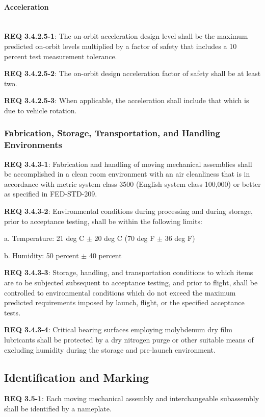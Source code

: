 \documentclass[12pt]{article}
\begin{document}
\paragraph{Acceleration} \mbox{} \\ %
\noindent \textbf{REQ 3.4.2.5-1}: The on-orbit acceleration design level shall be the maximum predicted on-orbit levels multiplied by a factor of safety that includes a 10 percent test measurement tolerance. 

\noindent \textbf{REQ 3.4.2.5-2}: The on-orbit design acceleration factor of safety shall be at least two. 

\noindent \textbf{REQ 3.4.2.5-3}: When applicable, the acceleration shall include that which is due to vehicle rotation.


\subsubsection{Fabrication, Storage, Transportation, and Handling Environments} %
\noindent \textbf{REQ 3.4.3-1}: Fabrication and handling of moving mechanical assemblies shall be accomplished in a clean room environment with an air cleanliness that is in accordance with metric system class 3500 (English system class 100,000) or better as specified in FED-STD-209. 

\noindent \textbf{REQ 3.4.3-2}: Environmental conditions during processing and during storage, prior to acceptance testing, shall be within the following limits:

a. Temperature: 21 deg C $\pm$ 20 deg C (70 deg F $\pm$ 36 deg F)

b. Humidity: 50 percent $\pm$ 40 percent

\noindent \textbf{REQ 3.4.3-3}: Storage, handling, and transportation conditions to which items are to be subjected subsequent to acceptance testing, and prior to flight, shall be controlled to environmental conditions which do not exceed the maximum predicted requirements imposed by launch, flight, or the specified acceptance tests.

\noindent \textbf{REQ 3.4.3-4}: Critical bearing surfaces employing molybdenum dry film lubricants shall be protected by a dry nitrogen purge or other suitable means of excluding humidity during the storage and pre-launch environment.


\clearpage
\subsection{Identification and Marking} %
\noindent \textbf{REQ 3.5-1}: Each moving mechanical assembly and interchangeable subassembly shall be identified by a nameplate.
 
\end{document}
